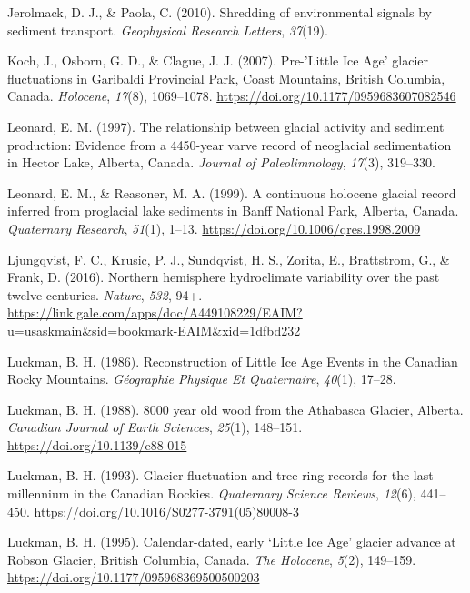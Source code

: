 \documentclass[
  letterpaper,
  DIV=11,
  numbers=noendperiod]{scrartcl}
\newlength{\cslhangindent}
\newlength{\cslentryspacingunit} %
\newenvironment{CSLReferences}[2] %
 {%
  \setlength{\parindent}{0pt}
  \ifodd #1
  \let\oldpar\par
  \def\par{\hangindent=\cslhangindent\oldpar}
  \fi
  \setlength{\parskip}{#2\cslentryspacingunit}
 }%
 {}
\begin{document}
\begin{CSLReferences}{1}{0}
\leavevmode{}%
Jerolmack, D. J., \& Paola, C. (2010). {Shredding of environmental
signals by sediment transport}. \emph{Geophysical Research Letters},
\emph{37}(19).

\leavevmode{}%
Koch, J., Osborn, G. D., \& Clague, J. J. (2007). {Pre-'Little Ice Age'
glacier fluctuations in Garibaldi Provincial Park, Coast Mountains,
British Columbia, Canada}. \emph{Holocene}, \emph{17}(8), 1069--1078.
\url{https://doi.org/10.1177/0959683607082546}

\leavevmode{}%
Leonard, E. M. (1997). {The relationship between glacial activity and
sediment production: Evidence from a 4450-year varve record of
neoglacial sedimentation in Hector Lake, Alberta, Canada}. \emph{Journal
of Paleolimnology}, \emph{17}(3), 319--330.

\leavevmode{}%
Leonard, E. M., \& Reasoner, M. A. (1999). {A continuous holocene
glacial record inferred from proglacial lake sediments in Banff National
Park, Alberta, Canada}. \emph{Quaternary Research}, \emph{51}(1), 1--13.
\url{https://doi.org/10.1006/qres.1998.2009}

\leavevmode{}%
Ljungqvist, F. C., Krusic, P. J., Sundqvist, H. S., Zorita, E.,
Brattstrom, G., \& Frank, D. (2016). {Northern hemisphere hydroclimate
variability over the past twelve centuries}. \emph{Nature}, \emph{532},
94+.
\url{https://link.gale.com/apps/doc/A449108229/EAIM?u=usaskmain\&sid=bookmark-EAIM\&xid=1dfbd232}

\leavevmode{}%
Luckman, B. H. (1986). {Reconstruction of Little Ice Age Events in the
Canadian Rocky Mountains}. \emph{G{é}ographie Physique Et Quaternaire},
\emph{40}(1), 17--28.

\leavevmode{}%
Luckman, B. H. (1988). {8000 year old wood from the Athabasca Glacier,
Alberta}. \emph{Canadian Journal of Earth Sciences}, \emph{25}(1),
148--151. \url{https://doi.org/10.1139/e88-015}

\leavevmode{}%
Luckman, B. H. (1993). {Glacier fluctuation and tree-ring records for
the last millennium in the Canadian Rockies}. \emph{Quaternary Science
Reviews}, \emph{12}(6), 441--450.
\url{https://doi.org/10.1016/S0277-3791(05)80008-3}

\leavevmode{}%
Luckman, B. H. (1995). {Calendar-dated, early `Little Ice Age' glacier
advance at Robson Glacier, British Columbia, Canada}. \emph{The
Holocene}, \emph{5}(2), 149--159.
\url{https://doi.org/10.1177/095968369500500203}


\end{CSLReferences}
\end{document}
